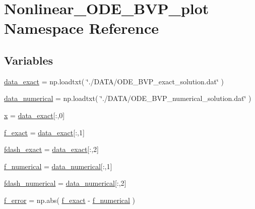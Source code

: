 \hypertarget{namespaceNonlinear__ODE__BVP__plot}{}\section{Nonlinear\+\_\+\+O\+D\+E\+\_\+\+B\+V\+P\+\_\+plot Namespace Reference}
\label{namespaceNonlinear__ODE__BVP__plot}
\subsection*{Variables}
\begin{DoxyCompactItemize}
\item 
\hyperlink{namespaceNonlinear__ODE__BVP__plot_a8a4b03bd9076bc386fff3acd096abbf7}{data\+\_\+exact} = np.\+loadtxt( \char`\"{}./D\+A\+TA/O\+D\+E\+\_\+\+B\+V\+P\+\_\+exact\+\_\+solution.\+dat\char`\"{} )
\item 
\hyperlink{namespaceNonlinear__ODE__BVP__plot_ab0290e43d5713cc17b0d8faed42e013f}{data\+\_\+numerical} = np.\+loadtxt( \char`\"{}./D\+A\+TA/O\+D\+E\+\_\+\+B\+V\+P\+\_\+numerical\+\_\+solution.\+dat\char`\"{} )
\item 
\hyperlink{namespaceNonlinear__ODE__BVP__plot_a7f690daf7ecd16777e3901bb3b698134}{x} = \hyperlink{namespaceNonlinear__ODE__BVP__plot_a8a4b03bd9076bc386fff3acd096abbf7}{data\+\_\+exact}\mbox{[}\+:,0\mbox{]}
\item 
\hyperlink{namespaceNonlinear__ODE__BVP__plot_a846fb76e3260067ca8a8d9d79211e6fd}{f\+\_\+exact} = \hyperlink{namespaceNonlinear__ODE__BVP__plot_a8a4b03bd9076bc386fff3acd096abbf7}{data\+\_\+exact}\mbox{[}\+:,1\mbox{]}
\item 
\hyperlink{namespaceNonlinear__ODE__BVP__plot_a7812be90d09cb7b6be00e129f91acd36}{fdash\+\_\+exact} = \hyperlink{namespaceNonlinear__ODE__BVP__plot_a8a4b03bd9076bc386fff3acd096abbf7}{data\+\_\+exact}\mbox{[}\+:,2\mbox{]}
\item 
\hyperlink{namespaceNonlinear__ODE__BVP__plot_ab81728aecabb942c491c297826ebf71e}{f\+\_\+numerical} = \hyperlink{namespaceNonlinear__ODE__BVP__plot_ab0290e43d5713cc17b0d8faed42e013f}{data\+\_\+numerical}\mbox{[}\+:,1\mbox{]}
\item 
\hyperlink{namespaceNonlinear__ODE__BVP__plot_a6439d7324acb06f63f8c18c171103032}{fdash\+\_\+numerical} = \hyperlink{namespaceNonlinear__ODE__BVP__plot_ab0290e43d5713cc17b0d8faed42e013f}{data\+\_\+numerical}\mbox{[}\+:,2\mbox{]}
\item 
\hyperlink{namespaceNonlinear__ODE__BVP__plot_ac170b8ff53c4176fbe06ac0cc7b2f211}{f\+\_\+error} = np.\+abs( \hyperlink{namespaceNonlinear__ODE__BVP__plot_a846fb76e3260067ca8a8d9d79211e6fd}{f\+\_\+exact} -\/ \hyperlink{namespaceNonlinear__ODE__BVP__plot_ab81728aecabb942c491c297826ebf71e}{f\+\_\+numerical} )

\end{DoxyCompactItemize}
